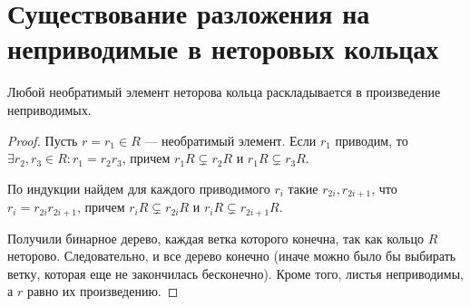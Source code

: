 \documentclass[11pt]{book}
\theoremstyle{definition}
\theoremstyle{plain}
\theoremstyle{plain}
\theoremstyle{definition}
\theoremstyle{remark}
\begin{document}
\section{Существование разложения на неприводимые в неторовых кольцах}
\begin{thm}
    Любой необратимый элемент неторова кольца раскладывается в произведение неприводимых.
\end{thm}
\begin{proof}
    Пусть $ r = r_1 \in R$ ---  необратимый элемент. Если $ r_1$ приводим, то $ \exists r_2, r_3 \in R: r_1 = r_2r_3$, причем $ r_1R \subsetneq r_2R$ и $ r_1R \subsetneq r_3R$.

    По индукции найдем для каждого приводимого $ r_i$ такие  $ r_{2i}, r_{2i+1}$, что $ r_i = r_{2i}r_{2i+1}$, причем $ r_iR \subsetneq r_{2i}R$ и $ r_{i}R \subsetneq r_{2i +1 }R $.

    Получили бинарное дерево, каждая ветка которого конечна, так как кольцо $ R$ неторово. Следовательно, и все дерево конечно (иначе можно было бы выбирать ветку, которая еще не закончилась бесконечно). Кроме того, листья неприводимы, а  $ r$ равно их произведению.
\end{proof}
\end{document}
